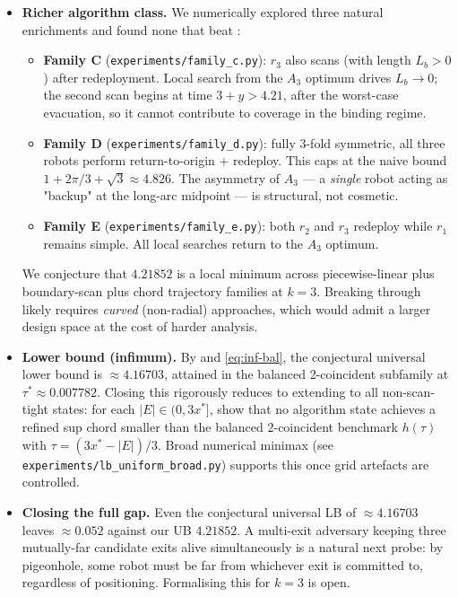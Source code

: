 \documentclass[11pt]{article}
\theoremstyle{plain}
\theoremstyle{definition}
\theoremstyle{remark}
\begin{document}
\begin{itemize}
\item \textbf{Richer algorithm class.} We numerically explored three
natural enrichments and found none that beat :
\begin{itemize}
\item \textbf{Family C} (\texttt{experiments/family\_c.py}): $r_3$ also
scans (with length $L_b > 0$) after redeployment. Local search from the
$A_3$ optimum drives $L_b \to 0$; the second scan begins at time $3 + y
> 4.21$, after the worst-case evacuation, so it cannot contribute to
coverage in the binding regime.
\item \textbf{Family D} (\texttt{experiments/family\_d.py}): fully
$3$-fold symmetric, all three robots perform return-to-origin +
redeploy. This caps at the naive bound $1 + 2\pi/3 + \sqrt 3 \approx
4.826$. The asymmetry of $A_3$ — a \emph{single} robot acting as
"backup" at the long-arc midpoint — is structural, not cosmetic.
\item \textbf{Family E} (\texttt{experiments/family\_e.py}): both $r_2$
and $r_3$ redeploy while $r_1$ remains simple. All local searches
return to the $A_3$ optimum.
\end{itemize}
We conjecture that $4.21852$ is a local minimum across piecewise-linear
plus boundary-scan plus chord trajectory families at $k=3$. Breaking
through likely requires \emph{curved} (non-radial) approaches, which
would admit a larger design space at the cost of harder analysis.
\item \textbf{Lower bound (infimum).} By
 and \eqref{eq:inf-bal}, the conjectural
universal lower bound is $\approx 4.16703$, attained in the balanced
2-coincident subfamily at $\tau^* \approx 0.007782$. Closing this
rigorously reduces to extending  to all
non-scan-tight states: for each $|E| \in (0, 3x^*]$, show that no
algorithm state achieves a refined sup chord smaller than the balanced
2-coincident benchmark $h(\tau)$ with $\tau = (3x^* - |E|)/3$. Broad
numerical minimax (see \texttt{experiments/lb\_uniform\_broad.py})
supports this once grid artefacts are controlled.
\item \textbf{Closing the full gap.} Even the conjectural universal
LB of $\approx 4.16703$ leaves $\approx 0.052$ against our UB $4.21852$. A
multi-exit adversary keeping three mutually-far candidate exits alive
simultaneously is a natural next probe: by pigeonhole, some robot
must be far from whichever exit is committed to, regardless of
positioning. Formalising this for $k=3$ is open.
\end{itemize}


\end{document}
